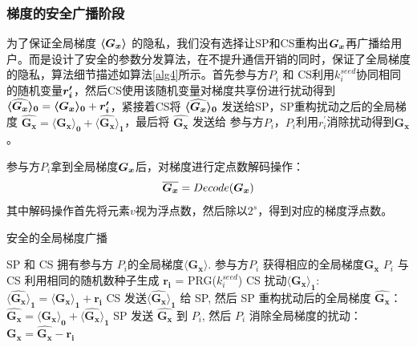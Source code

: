 \subsubsection{梯度的安全广播阶段}\label{distribution} 
为了保证全局梯度 $\svec{G_x}$ 的隐私，我们没有选择让SP和CS重构出$\bs{G_x}$再广播给用户。而是设计了安全的参数分发算法，在不提升通信开销的同时，保证了全局梯度的隐私，算法细节描述如算法\ref{alg4}所示。首先参与方$P_i$ 和 CS利用$k_i^{seed}$协同相同的随机变量$\bs{r_i^{\prime}}$，然后CS使用该随机变量对梯度共享份进行扰动得到 $\svec[0]{\widehat{G_x}} = \svec[0]{G_x} + \bs{r_i^{\prime}}$，紧接着CS将 $\svec[0]{\widehat{G_x}}$ 发送给SP，SP重构扰动之后的全局梯度 $\boldsymbol{\widehat{G_x}} = \boldsymbol{\langle G_x\rangle_0} + \boldsymbol{\langle \widehat{G_x}\rangle_1}$，最后将 $\boldsymbol{\widehat{G_x}}$ 发送给 参与方$P_i$，$P_i$利用$r_i^{\prime}$消除扰动得到$\boldsymbol{G_x}$。

参与方$P_i$拿到全局梯度$\bs{G_x}$后，对梯度进行定点数解码操作：
\begin{equation}
	\bs{\overline{G_x}} = Decode(\bs{G_x})
\end{equation}
其中解码操作首先将元素$v$视为浮点数，然后除以$2^s$，得到对应的梯度浮点数。

\begin{algorithm}[htbp]
	\caption{安全的全局梯度广播}
	\label{alg4}
	\begin{algorithmic}[1]
		\REQUIRE SP 和 CS 拥有参与方 $P_i$的全局梯度$\boldsymbol{\langle G_x\rangle}$.
		\ENSURE 参与方$P_i$ 获得相应的全局梯度$\boldsymbol{G_x}$
		\STATE $P_i$ 与 CS 利用相同的随机数种子生成 $\boldsymbol{r_i}$ = PRG($k_i^{seed}$) 
		\STATE CS 扰动$\boldsymbol{\langle G_x\rangle_1}$:\\ $\boldsymbol{\langle \widehat{G_x}\rangle_1} = \boldsymbol{\langle G_x\rangle_1} + \boldsymbol{r_i}$
		\STATE CS 发送$\boldsymbol{\langle \widehat{G_x}\rangle_1}$ 给 SP, 然后 SP 重构扰动后的全局梯度 $\boldsymbol{\widehat{G_x}}$：\\ $\boldsymbol{\widehat{G_x}} = \boldsymbol{\langle G_x\rangle_0} + \boldsymbol{\langle \widehat{G_x}\rangle_1}$
		\STATE SP 发送 $\boldsymbol{\widehat{G_x}}$ 到 $P_i$, 然后 $P_i$ 消除全局梯度的扰动：\\$\boldsymbol{G_x} = \boldsymbol{\widehat{G_x}} - \boldsymbol{r_i}$
	\end{algorithmic}
\end{algorithm}

